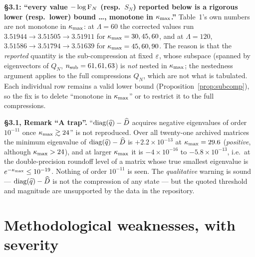 \documentclass[11pt]{article}
\newcommand{\file}[1]{\texttt{\detokenize{#1}}}
\begin{document}
\begin{verdictbreak}
\textbf{\S3.1: ``every value $-\log\operatorname{F}_N$ (resp.\ $S_N$) reported below is a rigorous lower
(resp.\ lower) bound \dots, monotone in $\kappa_{\max}$.''}  Table~1's own numbers are not monotone in
$\kappa_{\max}$: at $\Lambda=60$ the corrected values run $3.51944\to3.51505\to3.51911$ for
$\kappa_{\max}=30,45,60$, and at $\Lambda=120$, $3.51586\to3.51794\to3.51639$ for $\kappa_{\max}=45,60,90$.  The
reason is that the \emph{reported} quantity is the sub-compression at fixed $\varepsilon$, whose subspace
(spanned by eigenvectors of $Q_N$, $n_{\rm sub}=61,61,63$) is \emph{not} nested in $\kappa_{\max}$; the
nestedness argument applies to the full compressions $Q_N$, which are not what is tabulated.  Each
individual row remains a valid lower bound (Proposition~\ref{prop:subcomp}), so the fix is to delete
``monotone in $\kappa_{\max}$'' or to restrict it to the full compressions.
\end{verdictbreak}

\begin{verdictgap}
\textbf{\S3.1, Remark ``A trap''.}  ``$\operatorname{diag}(\widehat q)-\widehat D$ acquires negative
eigenvalues of order $10^{-11}$ once $\kappa_{\max}\gtrsim24$'' is not reproduced.  Over all twenty-one
archived \file{Dhat_exact_*} matrices the minimum eigenvalue of $\operatorname{diag}(\widehat q)-\widehat D$
is $+2.2\times10^{-13}$ at $\kappa_{\max}=29.6$ (\emph{positive}, although $\kappa_{\max}>24$), and at larger
$\kappa_{\max}$ it is $-4\times10^{-16}$ to $-5.8\times10^{-13}$, i.e.\ at the double-precision roundoff
level of a matrix whose true smallest eigenvalue is $e^{-\kappa_{\max}}\le10^{-19}$.  Nothing of order
$10^{-11}$ is seen.  The \emph{qualitative} warning is sound --- $\operatorname{diag}(\widehat q)-\widehat D$
is not the compression of any state --- but the quoted threshold and magnitude are unsupported by
the data in the repository.
\end{verdictgap}

\section{Methodological weaknesses, with severity}\label{sec:weak}
\end{document}
